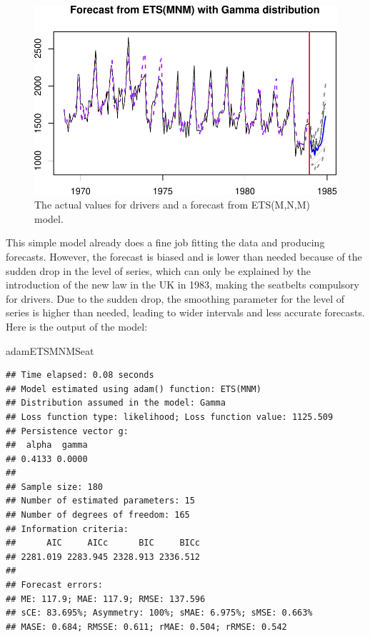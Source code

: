 \documentclass[
]{book}
\newenvironment{Shaded}{\begin{snugshade}}{\end{snugshade}}
\newcommand{\NormalTok}[1]{#1}
\theoremstyle{definition}
\theoremstyle{definition}
\theoremstyle{definition}
\theoremstyle{definition}
\theoremstyle{remark}
\begin{document}
\begin{figure}
\centering
\includegraphics{Svetunkov--2022----ADAM_files/figure-latex/SeatbeltsForecast-1.pdf}
\caption{\label{fig:SeatbeltsForecast}The actual values for drivers and a forecast from ETS(M,N,M) model.}
\end{figure}

This simple model already does a fine job fitting the data and producing forecasts. However, the forecast is biased and is lower than needed because of the sudden drop in the level of series, which can only be explained by the introduction of the new law in the UK in 1983, making the seatbelts compulsory for drivers. Due to the sudden drop, the smoothing parameter for the level of series is higher than needed, leading to wider intervals and less accurate forecasts. Here is the output of the model:

\begin{Shaded}
\begin{Highlighting}[]
\NormalTok{adamETSMNMSeat}
\end{Highlighting}
\end{Shaded}

\begin{verbatim}
## Time elapsed: 0.08 seconds
## Model estimated using adam() function: ETS(MNM)
## Distribution assumed in the model: Gamma
## Loss function type: likelihood; Loss function value: 1125.509
## Persistence vector g:
##  alpha  gamma 
## 0.4133 0.0000 
## 
## Sample size: 180
## Number of estimated parameters: 15
## Number of degrees of freedom: 165
## Information criteria:
##      AIC     AICc      BIC     BICc 
## 2281.019 2283.945 2328.913 2336.512 
## 
## Forecast errors:
## ME: 117.9; MAE: 117.9; RMSE: 137.596
## sCE: 83.695%; Asymmetry: 100%; sMAE: 6.975%; sMSE: 0.663%
## MASE: 0.684; RMSSE: 0.611; rMAE: 0.504; rRMSE: 0.542
\end{verbatim}
\end{document}
